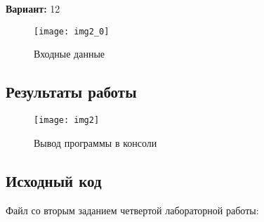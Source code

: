 {\bfseries Вариант:} 12

\begin{figure}[h!]
\centering
\texttt{[image: img2\_0]}
\caption{Входные данные}
\end{figure}

\subsection{Результаты работы}
\begin{figure}[h!]
\centering
\texttt{[image: img2]}
\caption{Вывод программы в консоли}
\end{figure}

\pagebreak

\subsection{Исходный код}
Файл со вторым заданием четвертой лабораторной работы:
